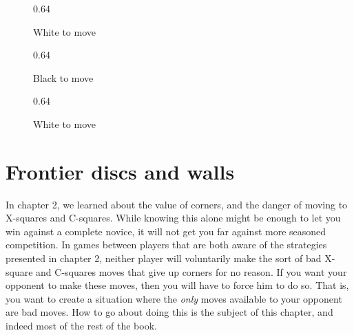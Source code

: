 \documentclass[a4paper,12pt]{book}
\newcommand{\scalefactorthreeup}{0.64}
\begin{document}
\begin{figure}[h]
\begin{center}
\begin{minipage}[t]{.32\textwidth}
\begin{othelloboard}{\scalefactorthreeup}
\dotmarkings
{}
\end{othelloboard}
\caption{White to move}
\end{minipage}
\hfill
\begin{minipage}[t]{.32\textwidth}
\begin{othelloboard}{\scalefactorthreeup}
\dotmarkings
{}
\end{othelloboard}
\caption{Black to move}
\end{minipage}
\hfill
\begin{minipage}[t]{.32\textwidth}
\begin{othelloboard}{\scalefactorthreeup}
\dotmarkings
{}
\end{othelloboard}
\caption{White to move}
\end{minipage}
\end{center}
\end{figure}

\chapter{Frontier discs and walls}
\captionsetup{figurename=Diagram}

In chapter 2, we learned about the value of corners, and the danger of moving to
X-squares and C-squares. While knowing this alone might be enough to let you win
against a complete novice, it will not get you far against more seasoned competition.
In games between players that are both aware of the strategies presented in chapter 2,
neither player will voluntarily make the sort of bad X-square and C-squares moves
that give up corners for no reason. If you want your opponent to make these moves,
then you will have to force him to do so. That is, you want to create a situation where
the \emph{only} moves available to your opponent are bad moves. How to go about doing this
is the subject of this chapter, and indeed most of the rest of the book.
\end{document}
